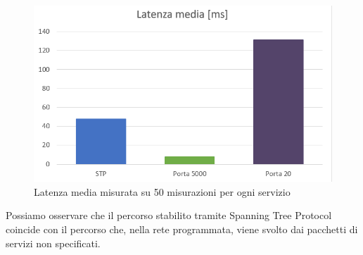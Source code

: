 \begin{figure}[H]
	\centering
	\includegraphics[width=0.9\linewidth]{../immagini/esempio/ping_medio}
	\caption[Latenza media]{Latenza media misurata su 50 misurazioni per ogni servizio}
	\label{fig:pingmedio}
\end{figure}
Possiamo osservare che il percorso stabilito tramite Spanning Tree Protocol coincide con il percorso che, nella rete programmata, viene svolto dai pacchetti di servizi non specificati.\\
